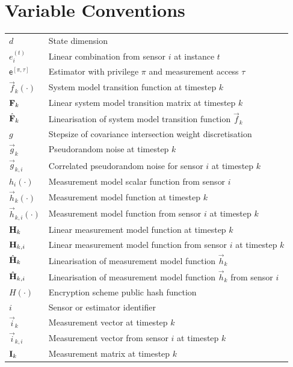 \documentclass[oneside]{scrbook}
\theoremstyle{definition}
\theoremstyle{definition}
\theoremstyle{remark}
\begin{document}
\section*{Variable Conventions}
\begin{longtable}{p{}p{}}
    $d$ & State dimension\\
    $e^{(t)}_i$ & Linear combination from sensor $i$ at instance $t$\\
    $\mathsf{e}^{[\pi,\tau]}$ & Estimator with privilege $\pi$ and measurement access $\tau$\\
    $\vec{f}_k(\cdot)$ & System model transition function at timestep $k$\\
    ${{\mathbf{F}}}_k$ & Linear system model transition matrix at timestep $k$\\
    $\hat{{{\mathbf{F}}}}_k$ & Linearisation of system model transition function $\vec{f}_k$\\
    $g$ & Stepsize of covariance intersection weight discretisation\\
    $\vec{g}_k$ & Pseudorandom noise at timestep $k$\\
    $\vec{g}_{k,i}$ & Correlated pseudorandom noise for sensor $i$ at timestep $k$\\
    $h_i(\cdot)$ & Measurement model scalar function from sensor $i$\\
    $\vec{h}_k(\cdot)$ & Measurement model function at timestep $k$\\
    $\vec{h}_{k,i}(\cdot)$ & Measurement model function from sensor $i$ at timestep $k$\\
    ${{\mathbf{H}}}_k$ & Linear measurement model function at timestep $k$\\
    ${{\mathbf{H}}}_{k,i}$ & Linear measurement model function from sensor $i$ at timestep $k$\\
    $\hat{{{\mathbf{H}}}}_k$ & Linearisation of measurement model function $\vec{h}_k$\\
    $\hat{{{\mathbf{H}}}}_{k,i}$ & Linearisation of measurement model function $\vec{h}_k$ from sensor $i$\\
    $H(\cdot)$ & Encryption scheme public hash function\\
    $i$ & Sensor or estimator identifier\\
    $\vec{i}_k$ & Measurement vector at timestep $k$\\
    $\vec{i}_{k,i}$ & Measurement vector from sensor $i$ at timestep $k$\\
    ${{\mathbf{I}}}_k$ & Measurement matrix at timestep $k$\\

\end{longtable}
\end{document}
